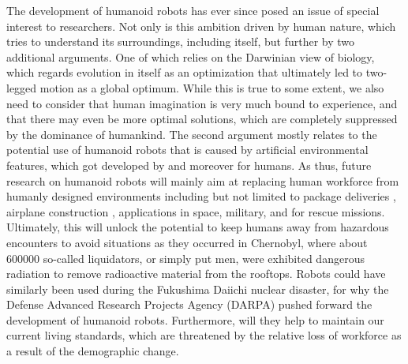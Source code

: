 \label{sec::1_in}
The development of humanoid robots has ever since posed an issue of special interest to researchers. Not only is this ambition driven by human nature, which tries to understand its surroundings, including itself, but further by two additional arguments. One of which relies on the Darwinian view of biology, which regards evolution in itself as an optimization that ultimately led to two-legged motion as a global optimum. While this is true to some extent, we also need to consider that human imagination is very much bound to experience, and that there may even be more optimal solutions, which are completely suppressed by the dominance of humankind. The second argument mostly relates to the potential use of humanoid robots that is caused by artificial environmental features, which got developed by and moreover for humans. As thus, future research on humanoid robots will mainly aim at replacing human workforce from humanly designed environments including but not limited to package deliveries \cite{cassieford}, airplane construction \cite{stasse2014airbus}, applications in space, military, and for rescue missions. Ultimately, this will unlock the potential to keep humans away from hazardous encounters to avoid situations as they occurred in Chernobyl, where about 600000 \cite{kinly2006chernobyl} so-called liquidators, or simply put men, were exhibited dangerous radiation to remove radioactive material from the rooftops. Robots could have similarly been used during the Fukushima Daiichi nuclear disaster, for why the Defense Advanced Research Projects Agency (DARPA) pushed forward the development of humanoid robots. Furthermore, will they help to maintain our current living standards, which are threatened by the relative loss of workforce as a result of the demographic change. \\\\
